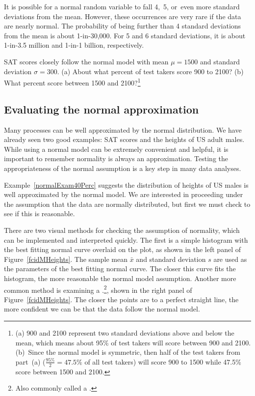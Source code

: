 It is possible for a normal random variable to fall 4,~5, or~even more standard deviations from the mean. However, these occurrences are very rare if the data are nearly normal. The probability of being further than 4 standard deviations from the mean is about 1-in-30,000. For 5 and 6 standard deviations, it is about 1-in-3.5 million and 1-in-1 billion, respectively.

\begin{exercise}
SAT scores closely follow the normal model with mean $\mu = 1500$ and standard deviation $\sigma = 300$. (a) About what percent of test takers score 900 to 2100? (b) What percent score between 1500 and 2100?\footnote{(a) 900 and 2100 represent two standard deviations above and below the mean, which means about 95\% of test takers will score between 900 and 2100. (b)~Since the normal model is symmetric, then half of the test takers from part~(a) ($\frac{95\%}{2} = 47.5\%$ of all test takers) will score 900 to 1500 while 47.5\% score between 1500 and 2100.}
\end{exercise}


\subsection{Evaluating the normal approximation}
\label{assessingNormal}

Many processes can be well approximated by the normal distribution. We have already seen two good examples: SAT scores and the heights of US adult males. While using a normal model can be extremely convenient and helpful, it is important to remember normality is always an approximation. Testing the appropriateness of the normal assumption is a key step in many data analyses.

Example~\ref{normalExam40Perc} suggests the distribution of heights of US males is well approximated by the normal model. We are interested in proceeding under the assumption that the data are normally distributed, but first we must check to see if this is reasonable.

There are two visual methods for checking the assumption of normality, which can be implemented and interpreted quickly. The first is a simple histogram with the best fitting normal curve overlaid on the plot, as shown in the left panel of Figure~\ref{fcidMHeights}. The sample mean $\bar{x}$ and standard deviation $s$ are used as the parameters of the best fitting normal curve. The closer this curve fits the histogram, the more reasonable the normal model assumption. Another more common method is examining a .\footnote{Also commonly called a .}, shown in the right panel of Figure~\ref{fcidMHeights}. The closer the points are to a perfect straight line, the more confident we can be that the data follow the normal model.

